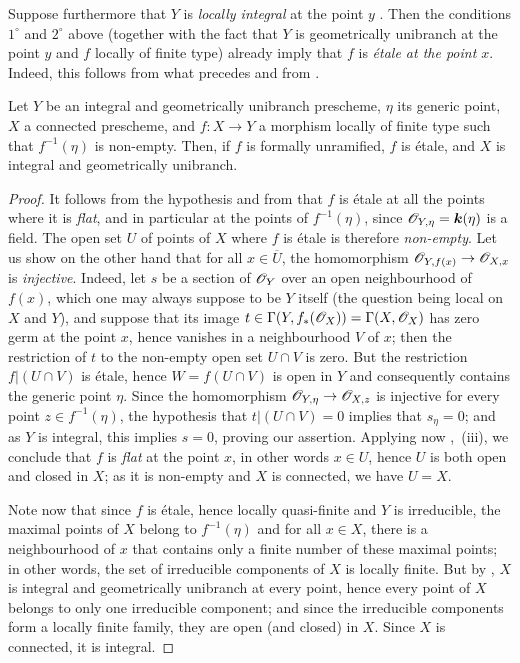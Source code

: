 \begin{remarks}[18.10.2]
\begin{enumerate}[label=(\roman*)]
Suppose furthermore that $Y$ is \emph{locally integral} at the point $y$ .
Then the conditions $1^{\circ}$ and $2^{\circ}$ above (together with the fact that $Y$ is geometrically unibranch at the point $y$ and $f$ locally of finite type) already imply that $f$ is \emph{\'etale at the point $x$}.
Indeed, this follows from what precedes and from .
\end{enumerate}
\end{remarks}

\begin{corollary}[18.10.3]
\label{IV.18.10.3}
Let $Y$ be an integral and geometrically unibranch prescheme, $\eta$ its generic point, $X$ a connected prescheme, and $f:X\to Y$ a morphism locally of finite type such that $f^{-1}(\eta)$ is non-empty.
Then, if $f$ is formally unramified, $f$ is \'etale, and $X$ is integral and geometrically unibranch.
\end{corollary}

\begin{proof}
It follows from the hypothesis and from  that $f$ is \'etale at all the points where it is \emph{flat}, and in particular at the points of $f^{-1}(\eta)$, since $\mathscr{O}_{Y,\eta}=\boldsymbol{k}(\eta)$ is a field.
The open set $U$ of points of $X$ where $f$ is \'etale is therefore \emph{non-empty}.
Let us show on the other hand that for all $x\in\overline{U}$, the homomorphism $\mathscr{O}_{Y,f(x)}\to\mathscr{O}_{X,x}$ is \emph{injective}.
Indeed, let $s$ be a section of $\mathscr{O}_Y$ over an open neighbourhood of $f(x)$, which one may always suppose to be $Y$ itself (the question being local on $X$ and $Y$), and suppose that its image $t\in\Gamma(Y,f_*(\mathscr{O}_X))=\Gamma(X,\mathscr{O}_X)$ has zero germ at the point $x$, hence vanishes in a neighbourhood $V$ of $x$; then the restriction of $t$ to the non-empty open set $U\cap V$ is zero. But the restriction $f|(U\cap V)$ is \'etale, hence $W=f(U\cap V)$ is open in $Y$ and consequently contains the generic point $\eta$. Since the homomorphism $\mathscr{O}_{Y,\eta}\to\mathscr{O}_{X,z}$ is injective for every point $z\in f^{-1}(\eta)$, the hypothesis that $t|(U\cap V)=0$ implies that $s_\eta=0$; and as $Y$ is integral, this implies $s=0$, proving our assertion.
Applying now ,~(iii), we conclude that $f$ is \emph{flat} at the point $x$, in other words $x\in U$, hence $U$ is both open and closed in $X$; as it is non-empty and $X$ is connected, we have $U=X$.

Note now that since $f$ is \'etale, hence locally quasi-finite and $Y$ is irreducible, the maximal points of $X$ belong to $f^{-1}(\eta)$  and for all $x\in X$, there is a neighbourhood of $x$ that contains only a finite number of these maximal points; in other words, the set of irreducible components of $X$ is locally finite.
But by , $X$ is integral and geometrically unibranch at every point, hence every point of $X$ belongs to only one irreducible component; and since the irreducible components form a locally finite family, they are open (and closed) in $X$. Since $X$ is connected, it is integral.
\end{proof}

